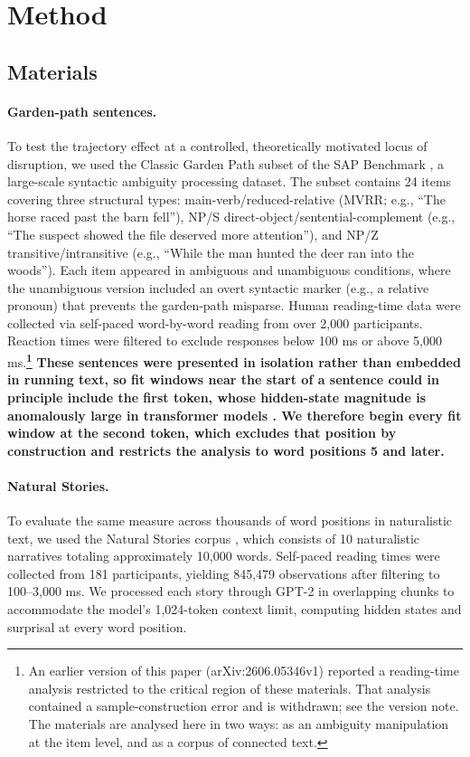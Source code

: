 \documentclass[12pt]{article}
\newcommand{\new}[1]{{\bfseries #1}}
\begin{document}
\section{Method}

\subsection{Materials}

\paragraph{Garden-path sentences.} To test the trajectory effect at a controlled, theoretically motivated locus of disruption, we used the Classic Garden Path subset of the SAP Benchmark \citep{huang2024}, a large-scale syntactic ambiguity processing dataset. The subset contains 24 items covering three structural types: main-verb/reduced-relative (MVRR; e.g., ``The horse raced past the barn fell''), NP/S direct-object/sentential-complement (e.g., ``The suspect showed the file deserved more attention''), and NP/Z transitive/intransitive (e.g., ``While the man hunted the deer ran into the woods''). Each item appeared in ambiguous and unambiguous conditions, where the unambiguous version included an overt syntactic marker (e.g., a relative pronoun) that prevents the garden-path misparse. Human reading-time data were collected via self-paced word-by-word reading from over 2,000 participants. Reaction times were filtered to exclude responses below 100 ms or above 5,000 ms.\new{\footnote{An earlier version of this paper (arXiv:2606.05346v1) reported a reading-time analysis restricted to the critical region of these materials. That analysis contained a sample-construction error and is withdrawn; see the version note. The materials are analysed here in two ways: as an ambiguity manipulation at the item level, and as a corpus of connected text.}} \new{These sentences were presented in isolation rather than embedded in running text, so fit windows near the start of a sentence could in principle include the first token, whose hidden-state magnitude is anomalously large in transformer models \citep{xiao2023}. We therefore begin every fit window at the second token, which excludes that position by construction and restricts the analysis to word positions 5 and later.}

\paragraph{Natural Stories.} To evaluate the same measure across thousands of word positions in naturalistic text, we used the Natural Stories corpus \citep{futrell2018}, which consists of 10 naturalistic narratives totaling approximately 10,000 words. Self-paced reading times were collected from 181 participants, yielding 845,479 observations after filtering to 100--3,000 ms. We processed each story through GPT-2 in overlapping chunks to accommodate the model's 1,024-token context limit, computing hidden states and surprisal at every word position.
\end{document}
